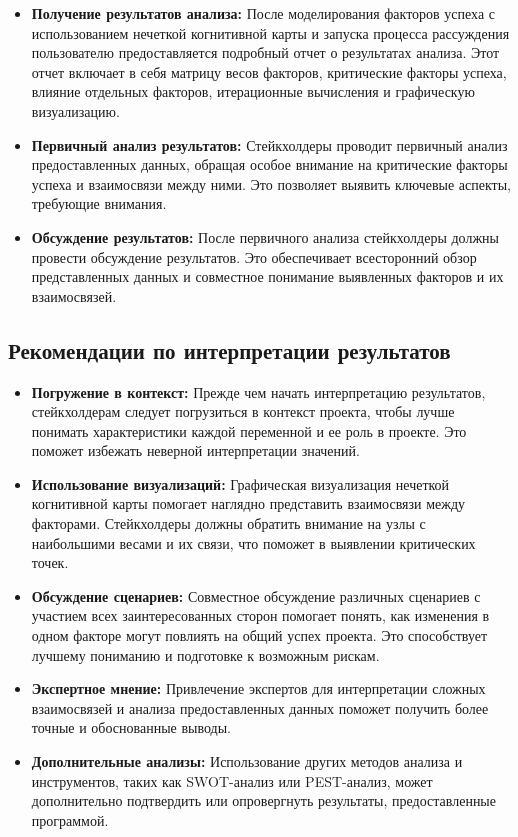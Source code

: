 \documentclass{article}
\begin{document}
    \begin{itemize}
        \item \textbf{Получение результатов анализа:}
        После моделирования факторов успеха с использованием нечеткой когнитивной карты и запуска процесса рассуждения пользователю предоставляется подробный отчет о результатах анализа. Этот отчет включает в себя матрицу весов факторов, критические факторы успеха, влияние отдельных факторов, итерационные вычисления и графическую визуализацию.
        \item \textbf{Первичный анализ результатов:}
        Стейкхолдеры проводит первичный анализ предоставленных данных, обращая особое внимание на критические факторы успеха и взаимосвязи между ними. Это позволяет выявить ключевые аспекты, требующие внимания.
        \item \textbf{Обсуждение результатов:}
        После первичного анализа стейкхолдеры должны провести обсуждение результатов. Это обеспечивает всесторонний обзор представленных данных и совместное понимание выявленных факторов и их взаимосвязей.
    \end{itemize}

    \subsection{Рекомендации по интерпретации результатов}

    \begin{itemize}
        \item \textbf{Погружение в контекст:}
        Прежде чем начать интерпретацию результатов, стейкхолдерам следует погрузиться в контекст проекта, чтобы лучше понимать характеристики каждой переменной и ее роль в проекте. Это поможет избежать неверной интерпретации значений.
        \item \textbf{Использование визуализаций:}
        Графическая визуализация нечеткой когнитивной карты помогает наглядно представить взаимосвязи между факторами. Стейкхолдеры должны обратить внимание на узлы с наибольшими весами и их связи, что поможет в выявлении критических точек.
        \item \textbf{Обсуждение сценариев:}
        Совместное обсуждение различных сценариев с участием всех заинтересованных сторон помогает понять, как изменения в одном факторе могут повлиять на общий успех проекта. Это способствует лучшему пониманию и подготовке к возможным рискам.
        \item \textbf{Экспертное мнение:}
        Привлечение экспертов для интерпретации сложных взаимосвязей и анализа предоставленных данных поможет получить более точные и обоснованные выводы.
        \item \textbf{Дополнительные анализы:}
        Использование других методов анализа и инструментов, таких как SWOT-анализ или PEST-анализ, может дополнительно подтвердить или опровергнуть результаты, предоставленные программой.
    \end{itemize}
\end{document}

